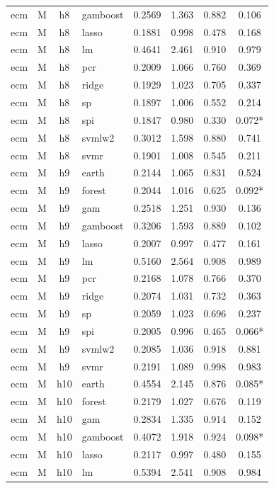 \begin{ThreePartTable}
\begin{longtable}[t]{llclcccc}
ecm & M & h8 & gamboost & 0.2569 & 1.363 & 0.882 & 0.106\\
ecm & M & h8 & lasso & 0.1881 & 0.998 & 0.478 & 0.168\\
ecm & M & h8 & lm & 0.4641 & 2.461 & 0.910 & 0.979\\
ecm & M & h8 & pcr & 0.2009 & 1.066 & 0.760 & 0.369\\
ecm & M & h8 & ridge & 0.1929 & 1.023 & 0.705 & 0.337\\
ecm & M & h8 & sp & 0.1897 & 1.006 & 0.552 & 0.214\\
ecm & M & h8 & spi & 0.1847 & 0.980 & 0.330 & 0.072*\\
ecm & M & h8 & svmlw2 & 0.3012 & 1.598 & 0.880 & 0.741\\
ecm & M & h8 & svmr & 0.1901 & 1.008 & 0.545 & 0.211\\
\addlinespace
ecm & M & h9 & earth & 0.2144 & 1.065 & 0.831 & 0.524\\
ecm & M & h9 & forest & 0.2044 & 1.016 & 0.625 & 0.092*\\
ecm & M & h9 & gam & 0.2518 & 1.251 & 0.930 & 0.136\\
ecm & M & h9 & gamboost & 0.3206 & 1.593 & 0.889 & 0.102\\
ecm & M & h9 & lasso & 0.2007 & 0.997 & 0.477 & 0.161\\
ecm & M & h9 & lm & 0.5160 & 2.564 & 0.908 & 0.989\\
ecm & M & h9 & pcr & 0.2168 & 1.078 & 0.766 & 0.370\\
ecm & M & h9 & ridge & 0.2074 & 1.031 & 0.732 & 0.363\\
ecm & M & h9 & sp & 0.2059 & 1.023 & 0.696 & 0.237\\
ecm & M & h9 & spi & 0.2005 & 0.996 & 0.465 & 0.066*\\
ecm & M & h9 & svmlw2 & 0.2085 & 1.036 & 0.918 & 0.881\\
ecm & M & h9 & svmr & 0.2191 & 1.089 & 0.998 & 0.983\\
\addlinespace
ecm & M & h10 & earth & 0.4554 & 2.145 & 0.876 & 0.085*\\
ecm & M & h10 & forest & 0.2179 & 1.027 & 0.676 & 0.119\\
ecm & M & h10 & gam & 0.2834 & 1.335 & 0.914 & 0.152\\
ecm & M & h10 & gamboost & 0.4072 & 1.918 & 0.924 & 0.098*\\
ecm & M & h10 & lasso & 0.2117 & 0.997 & 0.480 & 0.155\\
ecm & M & h10 & lm & 0.5394 & 2.541 & 0.908 & 0.984\\

\end{longtable}
\end{ThreePartTable}
